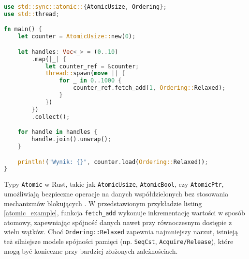 \begin{lstlisting}[language=Rust, caption=Przykład użycia Atomic, label=atomic_example]
use std::sync::atomic::{AtomicUsize, Ordering};
use std::thread;

fn main() {
    let counter = AtomicUsize::new(0);

    let handles: Vec<_> = (0..10)
        .map(|_| {
            let counter_ref = &counter;
            thread::spawn(move || {
                for _ in 0..1000 {
                    counter_ref.fetch_add(1, Ordering::Relaxed);
                }
            })
        })
        .collect();

    for handle in handles {
        handle.join().unwrap();
    }

    println!("Wynik: {}", counter.load(Ordering::Relaxed));
}
\end{lstlisting}
Typy \texttt{Atomic} w Rust, takie jak \texttt{AtomicUsize}, \texttt{AtomicBool}, czy \texttt{AtomicPtr}, umożliwiają bezpieczne operacje na danych współdzielonych bez stosowania mechanizmów blokujących . W przedstawionym przykładzie listing \ref{atomic_example}, funkcja \texttt{fetch\_add} wykonuje inkrementację wartości w sposób atomowy, zapewniając spójność danych nawet przy równoczesnym dostępie z wielu wątków. Choć \texttt{Ordering::Relaxed} zapewnia najmniejszy narzut, istnieją też silniejsze modele spójności pamięci (np. \texttt{SeqCst}, \texttt{Acquire/Release}), które mogą być konieczne przy bardziej złożonych zależnościach.

